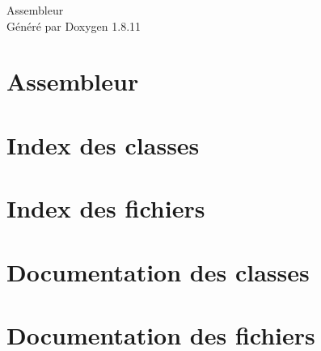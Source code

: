 \documentclass[twoside]{book}
\newcommand{\+}{\discretionary{\mbox{\scriptsize$\hookleftarrow$}}{}{}}
\newcommand{\clearemptydoublepage}{%
  \newpage{\pagestyle{empty}\cleardoublepage}%
}
\begin{document}
\hypersetup{pageanchor=false,
             bookmarksnumbered=true,
             pdfencoding=unicode
            }
\begin{titlepage}
\vspace*{7cm}
\begin{center}%
{\Large Assembleur }\\
\vspace*{1cm}
{\large Généré par Doxygen 1.8.11}\\
\end{center}
\end{titlepage}
\clearemptydoublepage
\tableofcontents
\clearemptydoublepage
{}
\hypersetup{pageanchor=true}

\chapter{Assembleur}
\label{index}\hypertarget{index}{}
\chapter{Index des classes}

\chapter{Index des fichiers}

\chapter{Documentation des classes}



\chapter{Documentation des fichiers}



\backmatter
\newpage
{}
\clearemptydoublepage
{}
\printindex
\end{document}
